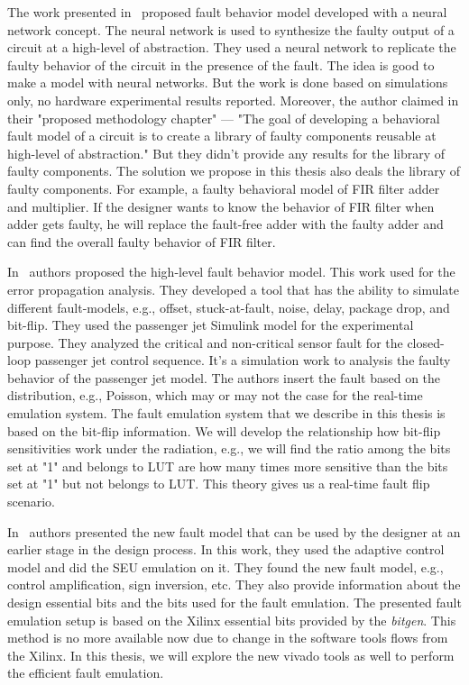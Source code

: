 The work presented in~\citep{mirzadeh2014modeling} proposed fault behavior model developed with a neural network
concept. The neural network is used to synthesize the faulty output of a
circuit at a high-level of abstraction. They used a neural network to replicate the faulty behavior of the circuit in the presence of the fault. The idea is good to make a model with neural networks. But the work is done based on simulations only, no hardware experimental results reported. Moreover, the author claimed in their "proposed methodology chapter"  --- "The goal of developing a behavioral fault model of a circuit is to create a library of faulty components reusable at high-level of abstraction." But they didn't provide any results for the library of faulty components. The solution we propose in this thesis also deals the library of faulty components. For example, a faulty behavioral model of FIR filter adder and multiplier. If the designer wants to know the behavior of FIR filter when adder gets faulty, he will replace the fault-free adder with the faulty adder and can find the overall faulty behavior of FIR filter.

In~\citep{janschek2017errorsim} authors proposed the high-level fault behavior model. This work used for the error propagation analysis. They developed a tool that has the ability to simulate different fault-models, e.g., offset, stuck-at-fault, noise, delay, package drop, and bit-flip. They used the passenger jet Simulink model for the experimental purpose. They analyzed the critical and non-critical sensor fault for the closed-loop passenger jet control sequence. It's  a simulation work to analysis the faulty behavior of the passenger jet model.  The authors insert the fault based on the distribution, e.g., Poisson, which may or may not the case for the real-time emulation system. The fault emulation system that we describe in this thesis is based on the bit-flip information. We will develop the relationship how bit-flip sensitivities work under the radiation,  e.g., we will find the ratio among the bits set at "1" and belongs to LUT are how many times more sensitive than the bits set at "1" but not belongs to LUT. This theory gives us a real-time fault flip scenario.

In~\citep{hobeika2013flight} authors presented the new fault model that can be used by the designer at an earlier stage in the design process. In this work, they used the adaptive control model and did the SEU emulation on it. They found the new fault model, e.g., control amplification, sign inversion, etc. They also provide information about the design essential bits and the bits used for the fault emulation. The presented fault emulation setup is based on the Xilinx essential bits provided by the \textit{bitgen}. This method is no more available now due to change in the software tools flows from the Xilinx. In this thesis, we will explore the new vivado tools as well to perform the efficient fault emulation. 

